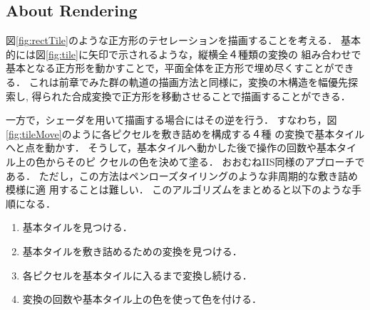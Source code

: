 \subsection{About Rendering}

図\ref{fig:rectTile}のような正方形のテセレーションを描画することを考える．
基本的には図\ref{fig:tile}に矢印で示されるような，縦横全４種類の変換の
組み合わせで基本となる正方形を動かすことで，平面全体を正方形で埋め尽くすことができる．
これは前章でみた群の軌道の描画方法と同様に，変換の木構造を幅優先探索し,
得られた合成変換で正方形を移動させることで描画することができる．

一方で，シェーダを用いて描画する場合にはその逆を行う．
すなわち，図\ref{fig:tileMove}のように各ピクセルを敷き詰めを構成する４種
の変換で基本タイルへと点を動かす．
そうして，基本タイルへ動かした後で操作の回数や基本タイル上の色からそのピ
クセルの色を決めて塗る．
おおむねIIS同様のアプローチである．
ただし，この方法はペンローズタイリングのような非周期的な敷き詰め模様に適
用することは難しい．
このアルゴリズムをまとめると以下のような手順になる．
\begin{enumerate}
 \item 基本タイルを見つける．
 \item 基本タイルを敷き詰めるための変換を見つける．
 \item 各ピクセルを基本タイルに入るまで変換し続ける．
 \item 変換の回数や基本タイル上の色を使って色を付ける．
\end{enumerate}

